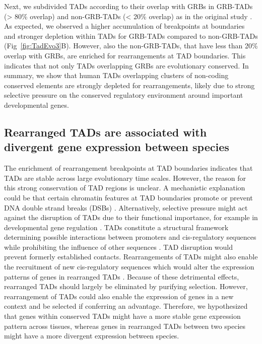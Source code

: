 \documentclass[a4paper,twoside=true,openright,parskip=full,chapterprefix=true,11pt,headings=normal,bibliography=totoc,listof=totoc,titlepage=on,captions=tableabove,draft=false]{scrreprt}
\theoremstyle{definition}
\theoremstyle{definition}
\theoremstyle{definition}
\theoremstyle{remark}
\begin{document}
Next, we subdivided TADs according to their overlap with GRBs in
GRB-TADs (\textgreater{} 80\% overlap) and non-GRB-TADs (\textless{}
20\% overlap) as in the original study \citep{Harmston2017}. As
expected, we observed a higher accumulation of breakpoints at boundaries
and stronger depletion within TADs for GRB-TADs compared to non-GRB-TADs
(Fig~\ref{fig:TadEvo3}B). However, also the non-GRB-TADs, that have less
than 20\% overlap with GRBs, are enriched for rearrangements at TAD
boundaries. This indicates that not only TADs overlapping GRBs are
evolutionary conserved. In summary, we show that human TADs overlapping
clusters of non-coding conserved elements are strongly depleted for
rearrangements, likely due to strong selective pressure on the conserved
regulatory environment around important developmental genes.

\subsection{Rearranged TADs are associated with divergent gene
expression between
species}\label{rearranged-tads-are-associated-with-divergent-gene-expression-between-species}

The enrichment of rearrangement breakpoints at TAD boundaries indicates
that TADs are stable across large evolutionary time scales. However, the
reason for this strong conservation of TAD regions is unclear. A
mechanistic explanation could be that certain chromatin features at TAD
boundaries promote or prevent DNA double strand breaks (DSBs)
\citep{Farre2015, Canela2017}. Alternatively, selective pressure might
act against the disruption of TADs due to their functional importance,
for example in developmental gene regulation
\citep{Nora2013, Farre2015}. TADs constitute a structural framework
determining possible interactions between promoters and cis-regulatory
sequences while prohibiting the influence of other sequences
\citep{Symmons2014, Lupianez2015}. TAD disruption would prevent formerly
established contacts. Rearrangements of TADs might also enable the
recruitment of new cis-regulatory sequences which would alter the
expression patterns of genes in rearranged TADs
\citep{Lupianez2015, Redin2016}. Because of these detrimental effects,
rearranged TADs should largely be eliminated by purifying selection.
However, rearrangement of TADs could also enable the expression of genes
in a new context and be selected if conferring an advantage. Therefore,
we hypothesized that genes within conserved TADs might have a more
stable gene expression pattern across tissues, whereas genes in
rearranged TADs between two species might have a more divergent
expression between species.
\end{document}
